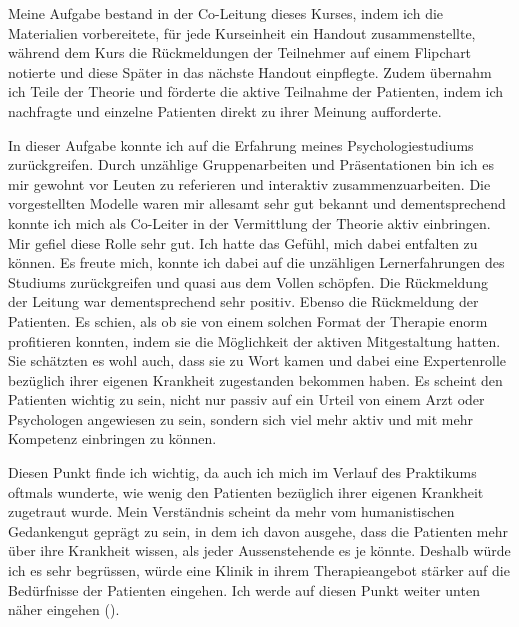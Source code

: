 Meine Aufgabe bestand in der Co-Leitung dieses Kurses, indem ich die Materialien vorbereitete, für jede Kurseinheit ein Handout zusammenstellte, während dem Kurs die Rückmeldungen der Teilnehmer auf einem Flipchart notierte und diese Später in das nächste Handout einpflegte. Zudem übernahm ich Teile der Theorie und förderte die aktive Teilnahme der Patienten, indem ich nachfragte und einzelne Patienten direkt zu ihrer Meinung aufforderte. 

In dieser Aufgabe konnte ich auf die Erfahrung meines Psychologiestudiums zurückgreifen. Durch unzählige Gruppenarbeiten und Präsentationen bin ich es mir gewohnt vor Leuten zu referieren und interaktiv zusammenzuarbeiten. Die vorgestellten Modelle waren mir allesamt sehr gut bekannt und dementsprechend konnte ich mich als Co-Leiter in der Vermittlung der Theorie aktiv einbringen. Mir gefiel diese Rolle sehr gut. Ich hatte das Gefühl, mich dabei entfalten zu können. Es freute mich, konnte ich dabei auf die unzähligen Lernerfahrungen des Studiums zurückgreifen und quasi aus dem Vollen schöpfen. Die Rückmeldung der Leitung war dementsprechend sehr positiv. Ebenso die Rückmeldung der Patienten. Es schien, als ob sie von einem solchen Format der Therapie enorm profitieren konnten, indem sie die Möglichkeit der aktiven Mitgestaltung hatten. Sie schätzten es wohl auch, dass sie zu Wort kamen und dabei eine Expertenrolle bezüglich ihrer eigenen Krankheit zugestanden bekommen haben. Es scheint den Patienten wichtig zu sein, nicht nur passiv auf ein Urteil von einem Arzt oder Psychologen angewiesen zu sein, sondern sich viel mehr aktiv und mit mehr Kompetenz einbringen zu können.

Diesen Punkt finde ich wichtig, da auch ich mich im Verlauf des Praktikums oftmals wunderte, wie wenig den Patienten bezüglich ihrer eigenen Krankheit zugetraut wurde. Mein Verständnis scheint da mehr vom humanistischen Gedankengut geprägt zu sein, in dem ich davon ausgehe, dass die Patienten mehr über ihre Krankheit wissen, als jeder Aussenstehende es je könnte. Deshalb würde ich es sehr begrüssen, würde eine Klinik in ihrem Therapieangebot stärker auf die Bedürfnisse der Patienten eingehen. Ich werde auf diesen Punkt weiter unten näher eingehen ().

